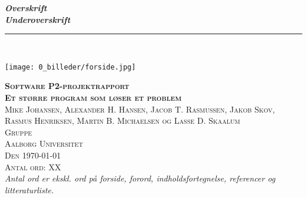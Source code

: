 
\thispagestyle{empty}
\begin{center}
\vspace{3cm}

\phantom{hul}

\phantom{hul}

\phantom{hul}

\textbf{\textsl{\Huge Overskrift}} \\ \vspace{0.2cm}
\textbf{\textsl{Underoverskrift}}\\ \vspace{0.5cm}

\rule{13cm}{3mm} \\ \vspace{0.3cm}
\vspace{0.6cm}

\texttt{[image: 0\_billeder/forside.jpg]}

\vspace{0.3cm} 
\textsc{
    \textbf{Software P2-projektrapport}\\
    \textbf{Et større program som løser et problem}\\
    Mike Johansen, Alexander H. Hansen, Jacob T. Rasmussen, Jakob Skov, Rasmus Henriksen, Martin B. Michaelsen og Lasse D. Skaalum\\
    Gruppe \name\\ %
    Aalborg Universitet\\
    Den \today\\
    Antal ord: XX \\
}   %
\vspace{1cm} 
{\footnotesize\itshape Antal ord er ekskl. ord på forside, forord, indholdsfortegnelse, referencer og litteraturliste.}
\end{center}